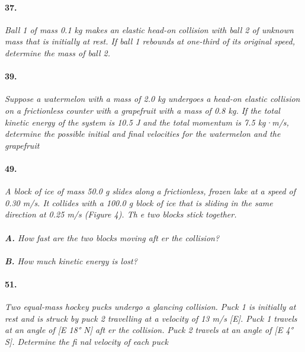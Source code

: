 \documentclass[]{article}
\begin{document}
	\paragraph{37.}
	\textit{
		Ball 1 of mass 0.1 kg makes an elastic head-on
		collision with ball 2 of unknown mass that is initially
		at rest. If ball 1 rebounds at one-third of its original
		speed, determine the mass of ball 2.
	}\\	
	\par
	\paragraph{39.}
	\textit{
		Suppose a watermelon with a mass of 2.0 kg undergoes
		a head-on elastic collision on a frictionless counter
		with a grapefruit with a mass of 0.8 kg. If the total
		kinetic energy of the system is 10.5 J and the total
		momentum is 7.5 kg·m/s, determine the possible
		initial and final velocities for the watermelon and
		the grapefruit
	}\\	
	\par
	\paragraph{49.}
	\textit{
		 A block of ice of mass 50.0 g slides along a
		frictionless, frozen lake at a speed of 0.30 m/s.
		It collides with a 100.0 g block of ice that is sliding
		in the same direction at 0.25 m/s (Figure	4). Th e two
		blocks stick together.
	}\\\\	
		\indent\textit{
		\textbf{A.} How fast are the two blocks moving aft er the
		collision? 
		}\\\\
		\indent\textit{
		\textbf{B.} How much kinetic energy is lost?
		}\\
	\par
	\paragraph{51.}
	\textit{
		Two equal-mass hockey pucks undergo a glancing
		collision. Puck 1 is initially at rest and is struck
		by puck 2 travelling at a velocity of 13 m/s [E].
		Puck 1 travels at an angle of [E 18° N] aft er the
		collision. Puck 2 travels at an angle of [E 4° S].
		Determine the fi nal velocity of each puck
	}\\	
	\par
	
\end{document}
